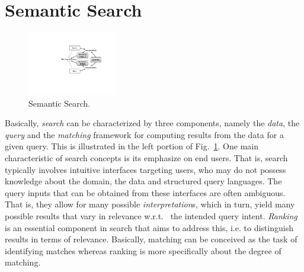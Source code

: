 \section{Semantic Search}\label{sec:ss}

\begin{figure}
	\centering
		\includegraphics[width=0.35\textwidth]{figs/semsearch.pdf}
	\caption{Semantic Search.}
	\label{fig:semsearch}
\end{figure}

Basically, \emph{search} can be characterized by three components, namely the \emph{data}, the \emph{query} and the \emph{matching} framework for computing results from the data for a given query. This is illustrated in the left portion of Fig.~\ref{fig:semsearch}. One main characteristic of search concepts is its emphasize on end users. That is, search typically involves intuitive interfaces targeting users, who may do not possess knowledge about the domain, the data and structured query languages. The query inputs that can be obtained from these interfaces are often ambiguous. That is, they allow for many possible \emph{interpretation}s, which in turn, yield many possible results that vary in relevance w.r.t.~ the intended query intent. 
\emph{Ranking} is an essential component in search that aims to address this, i.e. to distinguish results in terms of relevance. Basically, matching can be conceived as the task of identifying matches whereas ranking is more specifically about the degree of matching.   

